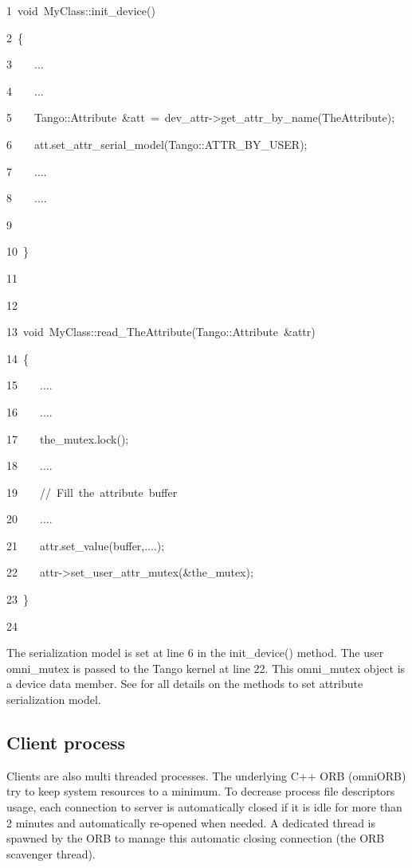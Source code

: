 
\begin{lyxcode}
1~void~MyClass::init\_device()

2~\{

3~~~~...

4~~~~...

5~~~~Tango::Attribute~\&att~=~dev\_attr->get\_attr\_by\_name(\textquotedbl{}TheAttribute\textquotedbl{});

6~~~~att.set\_attr\_serial\_model(Tango::ATTR\_BY\_USER);

7~~~~....

8~~~~....

9~

10~\}

11~

12~

13~void~MyClass::read\_TheAttribute(Tango::Attribute~\&attr)

14~\{

15~~~~....

16~~~~....

17~~~~the\_mutex.lock();

18~~~~....

19~~~~//~Fill~the~attribute~buffer

20~~~~....

21~~~~attr.set\_value(buffer,....);

22~~~~attr->set\_user\_attr\_mutex(\&the\_mutex);

23~\}

24~
\end{lyxcode}


The serialization model is set at line 6 in the init\_device() method.
The user omni\_mutex is passed to the Tango kernel at line 22. This
omni\_mutex object is a device data member. See \cite{TANGO_ref_man}
for all details on the methods to set attribute serialization model.

\subsection{Client process}

Clients are also multi threaded processes. The underlying C++ ORB
(omniORB) try to keep system resources to a minimum. To decrease process
file descriptors usage, each connection to server is automatically
closed if it is idle for more than 2 minutes and automatically re-opened
when needed. A dedicated thread is spawned by the ORB to manage this
automatic closing connection (the ORB scavenger thread).

